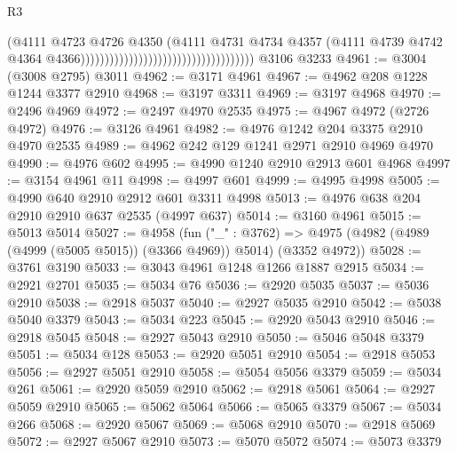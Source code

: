 \begin{lexlean}{R3}
\begin{coremodule}
                                                                      (@4111
                                                                        @4723
                                                                        @4726
                                                                        @4350
                                                                        (@4111
                                                                          @4731
                                                                          @4734
                                                                          @4357
                                                                          (@4111
                                                                            @4739
                                                                            @4742
                                                                            @4364
                                                                            @4366))))))))))))))))))))))))))))))))))))
    @3106
    @3233
@4961 := @3004 (@3008 @2795) @3011
@4962 := @3171 @4961
@4967 := @4962 @208 @1228 @1244 @3377 @2910
@4968 := @3197 @3311
@4969 := @3197 @4968
@4970 := @2496 @4969
@4972 := @2497 @4970 @2535
@4975 := @4967 @4972 (@2726 @4972)
@4976 := @3126 @4961
@4982 := @4976 @1242 @204 @3375 @2910 @4970 @2535
@4989 := @4962 @242 @129 @1241 @2971 @2910 @4969 @4970
@4990 := @4976 @602
@4995 := @4990 @1240 @2910 @2913 @601 @4968
@4997 := @3154 @4961 @11
@4998 := @4997 @601
@4999 := @4995 @4998
@5005 := @4990 @640 @2910 @2912 @601 @3311 @4998
@5013 := @4976 @638 @204 @2910 @2910 @637 @2535 (@4997 @637)
@5014 := @3160 @4961
@5015 := @5013 @5014
@5027 := @4958
    (fun ("_" : @3762) =>
    @4975 (@4982 (@4989 (@4999 (@5005 @5015)) (@3366 @4969)) @5014) (@3352 @4972))
@5028 := @3761 @3190
@5033 := @3043 @4961 @1248 @1266 @1887 @2915
@5034 := @2921 @2701
@5035 := @5034 @76
@5036 := @2920 @5035
@5037 := @5036 @2910
@5038 := @2918 @5037
@5040 := @2927 @5035 @2910
@5042 := @5038 @5040 @3379
@5043 := @5034 @223
@5045 := @2920 @5043 @2910
@5046 := @2918 @5045
@5048 := @2927 @5043 @2910
@5050 := @5046 @5048 @3379
@5051 := @5034 @128
@5053 := @2920 @5051 @2910
@5054 := @2918 @5053
@5056 := @2927 @5051 @2910
@5058 := @5054 @5056 @3379
@5059 := @5034 @261
@5061 := @2920 @5059 @2910
@5062 := @2918 @5061
@5064 := @2927 @5059 @2910
@5065 := @5062 @5064
@5066 := @5065 @3379
@5067 := @5034 @266
@5068 := @2920 @5067
@5069 := @5068 @2910
@5070 := @2918 @5069
@5072 := @2927 @5067 @2910
@5073 := @5070 @5072
@5074 := @5073 @3379

\end{coremodule}
\end{lexlean}
